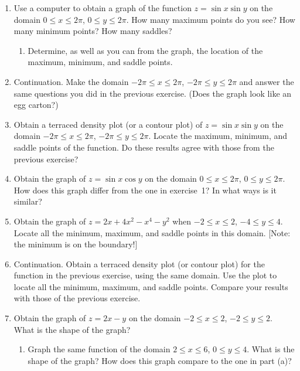 \begin{enumerate}
\item Use a computer to obtain a graph of the function $z = \sin{x}
\sin{y}$ on the domain $0 \leq x \leq 2 \pi$, $0 \leq y \leq 2 \pi$.
How many maximum points do you see?  How many minimum points?  How
many saddles?

  \begin{enumerate}
  \item Determine, as well as you can from the graph, the location of the
maximum, minimum, and saddle points.


\end{enumerate}
\item Continuation.  Make the domain $-2 \pi \leq x \leq 2 \pi$, $-2
\pi \leq y \leq 2 \pi$ and answer the same questions you did in the
previous exercise.  (Does the graph look like an egg carton?)


\item Obtain a terraced density plot (or a contour plot) of $z =
\sin{x} \sin{y}$ on the domain $-2 \pi \leq x \leq 2 \pi$, $-2 \pi
\leq y \leq 2 \pi$.  Locate the maximum, minimum, and saddle points of
the function.  Do these results agree with those from the previous
exercise?


\item Obtain the graph of $z = \sin{x} \cos{y}$ on the domain $0 \leq x
\leq 2 \pi$, $0 \leq y \leq 2 \pi$.  How does this graph differ from
the one in exercise~1?  In what ways is it similar?


\item \label{quartic} Obtain the graph of $z = 2x + 4 x^2 - x^4 - y^2$
when $-2 \leq x \leq 2$, $-4 \leq y \leq 4$.  Locate all the minimum,
maximum, and saddle points in this domain.  [Note: the minimum is on
  the boundary!]


\item Continuation.  Obtain a terraced density plot (or contour plot)
for the function in the previous exercise, using the same domain.  Use
the plot to locate all the minimum, maximum, and saddle points.
Compare your results with those of the previous exercise.


\item Obtain the graph of $z = 2x - y$ on the domain $-2 \leq x \leq
2$, $-2 \leq y \leq 2$.  What is the shape of the graph?

  \begin{enumerate}
  \item Graph the same function of the domain $2 \leq x \leq 6$, $0 \leq
y \leq 4$.  What is the shape of the graph?  How does this graph
compare to the one in part (a)?



\end{enumerate}
\end{enumerate}
